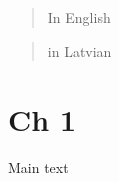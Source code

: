 \documentclass{report}
\begin{document}
\begin{abstract}
In English
\end{abstract}
 \renewcommand{\abstractname}{Anotācija}

\begin{abstract}
in Latvian
\end{abstract}
\tableofcontents
\chapter{Ch 1}
Main text 
\end{document}
